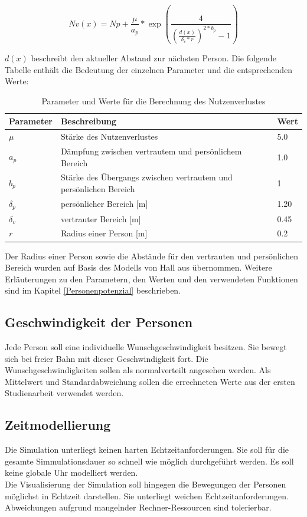 \begin{equation}
\label{Equ:NutzenverlustV}
Nv(x)= Np + \frac{\mu}{a_p} * \exp(\frac{4}{(\frac{d(x)}{\delta_v * r})^{2*b_p} -1}) 
\end{equation}

$d(x)$ beschreibt den aktueller Abstand zur nächsten Person. Die folgende Tabelle enthält die Bedeutung der einzelnen Parameter und die entsprechenden Werte: 

\begin{table}[htpb]
	\centering
	\begin{tabular}{lll}
		Parameter & Beschreibung  &  Wert\\ \hline
		$\mu$ & Stärke des Nutzenverlustes & 5.0 \\
		$a_p$ & Dämpfung zwischen vertrautem und persönlichem Bereich & 1.0 \\
		$b_p$ & Stärke des Übergangs zwischen vertrautem und persönlichen Bereich &1 \\
		$\delta_p$ & persönlicher Bereich [m]& 1.20 \\
		$\delta_v$ & vertrauter Bereich [m]& 0.45 \\
		$r$ & Radius einer Person [m] & 0.2  
	\end{tabular}
	\caption{Parameter und Werte für die Berechnung des Nutzenverlustes}
	\label{tab:parameterNutzenverlust}
\end{table}

Der Radius einer Person sowie die Abstände für den vertrauten und persönlichen Bereich wurden auf Basis des Modells von Hall aus \cite{VONSIVERS2015104} übernommen. Weitere Erläuterungen zu den Parametern, den Werten und den verwendeten Funktionen sind im Kapitel \ref{Personenpotenzial} beschrieben.
 
\subsection{Geschwindigkeit der Personen}
Jede Person soll eine individuelle Wunschgeschwindigkeit besitzen. Sie bewegt sich bei freier Bahn mit dieser Geschwindigkeit fort. Die Wunschgeschwindigkeiten sollen als normalverteilt angesehen werden. Als Mittelwert und Standardabweichung sollen die errechneten Werte aus der ersten Studienarbeit verwendet werden.

\subsection{Zeitmodellierung}
Die Simulation unterliegt keinen harten Echtzeitanforderungen. Sie soll für die gesamte Simmulationsdauer so schnell wie möglich durchgeführt werden. Es soll keine globale Uhr modelliert werden. \\
Die Visualisierung der Simulation soll hingegen die Bewegungen der Personen möglichst in Echtzeit darstellen. Sie unterliegt weichen Echtzeitanforderungen. Abweichungen aufgrund mangelnder Rechner-Ressourcen sind tolerierbar. 

